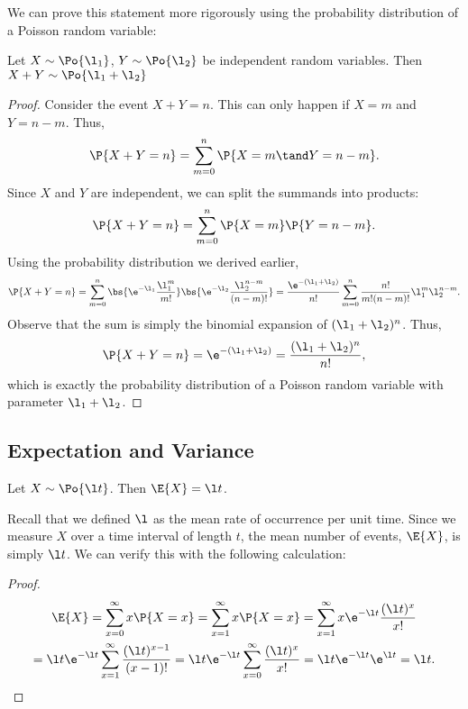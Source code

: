 We can prove this statement more rigorously using the probability distribution of a Poisson random variable:

\begin{proposition}
    Let $X \sim \Po{\l_1}$, $Y \sim \Po{\l_2}$ be independent random variables. Then $X + Y \sim \Po{\l_1 + \l_2}$
\end{proposition}
\begin{proof}
    Consider the event $X + Y = n$. This can only happen if $X = m$ and $Y = n - m$. Thus, \[\P{X + Y = n} = \sum_{m = 0}^n \P{X = m \tand Y = n -m}.\] Since $X$ and $Y$ are independent, we can split the summands into products: \[\P{X + Y = n} = \sum_{m = 0}^n \P{X = m} \P{Y = n -m}.\] Using the probability distribution we derived earlier, \[\P{X + Y = n} = \sum_{m = 0}^n \bs{\e^{-\l_1} \frac{\l_1^m}{m!}} \bs{\e^{-\l_2} \frac{\l_2^{n-m}}{(n-m)!}} = \frac{\e^{-(\l_1 + \l_2)}}{n!} \sum_{m = 0}^n \frac{n!}{m! (n-m)!} \l_1^m \l_2^{n-m}.\] Observe that the sum is simply the binomial expansion of $(\l_1 + \l_2)^{n}$. Thus, \[\P{X + Y = n} = \e^{-(\l_1 + \l_2)} = \frac{(\l_1 + \l_2)^n}{n!},\] which is exactly the probability distribution of a Poisson random variable with parameter $\l_1 + \l_2$.
\end{proof}

\subsection{Expectation and Variance}

\begin{proposition}
    Let $X \sim \Po{\l t}$. Then $\E{X} = \l t$.
\end{proposition}
Recall that we defined $\l$ as the mean rate of occurrence per unit time. Since we measure $X$ over a time interval of length $t$, the mean number of events, $\E{X}$, is simply $\l t$. We can verify this with the following calculation:
\begin{proof}
    \begin{gather*}
        \E{X} = \sum_{x = 0}^\infty  x \P{X = x} = \sum_{x = 1}^\infty  x \P{X = x} = \sum_{x = 1}^\infty  x \e^{-\l t} \frac{(\l t)^x}{x!}\\
        = \l t \e^{-\l t} \sum_{x = 1}^\infty \frac{(\l t)^{x-1}}{(x-1)!} = \l t \e^{-\l t} \sum_{x = 0}^\infty \frac{(\l t)^x}{x!} = \l t \e^{-\l t} \e^{\l t} = \l t.
    \end{gather*}
\end{proof}

